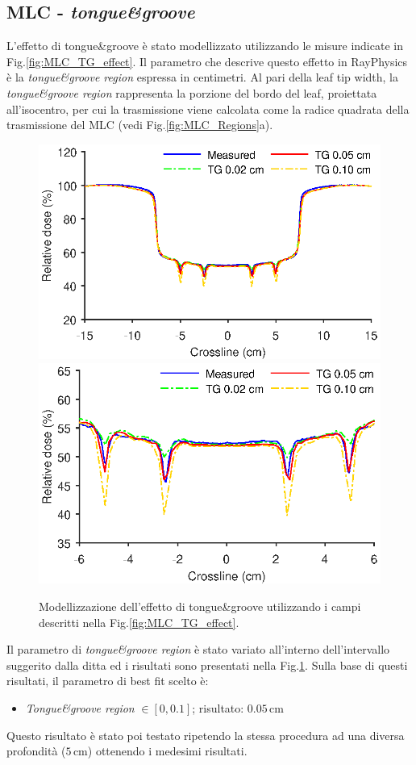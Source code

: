 \subsection{MLC - \textit{tongue\&{}groove}}
L'effetto di tongue\&{}groove è stato modellizzato utilizzando le misure indicate in Fig.\ref{fig:MLC_TG_effect}. Il parametro che descrive questo effetto in RayPhysics è la \textit{tongue\&{}groove region} espressa in centimetri. Al pari della leaf tip width, la \textit{tongue\&{}groove region} rappresenta la porzione del bordo del leaf, proiettata all'isocentro, per cui la trasmissione viene calcolata come la radice quadrata della trasmissione del MLC (vedi Fig.\ref{fig:MLC_Regions}a). 
\begin{figure}[!t]
\centering
\includegraphics[width=.49\textwidth]{./cap2/MLC_Plots/TG/TG_modeling.eps}
\includegraphics[width=.49\textwidth]{./cap2/MLC_Plots/TG/TG_modelingZOOM.eps}
\caption{Modellizzazione dell'effetto di tongue\&{}groove utilizzando i campi descritti nella Fig.\ref{fig:MLC_TG_effect}.}
\label{fig:MLC_TG_modeling}
\end{figure}

Il parametro di \textit{tongue\&{}groove region} è stato variato all'interno dell'intervallo suggerito dalla ditta ed i risultati sono presentati nella Fig.\ref{fig:MLC_TG_modeling}. Sulla base di questi risultati, il parametro di best fit scelto è:
\begin{itemize}
\item \textit{Tongue\&{}groove region} $\in [0, 0.1]$; risultato: $0.05\,$cm
\end{itemize}
Questo risultato è stato poi testato ripetendo la stessa procedura ad una diversa profondità ($5\,$cm) ottenendo i medesimi risultati.\\



